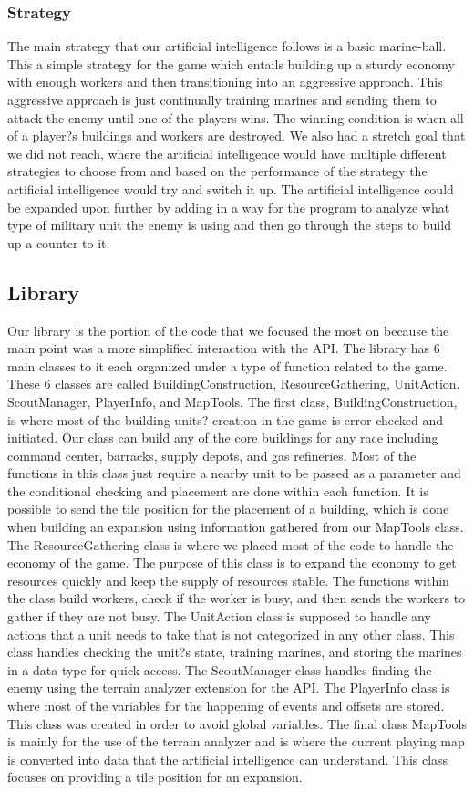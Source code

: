 \documentclass[10pt,letterpaper,onecolumn,draftclsnofoot]{IEEEtran}
\begin{document}
\subsubsection{Strategy}
The main strategy that our artificial intelligence follows is a basic marine-ball. This a simple strategy for the game which entails building up a sturdy economy with enough workers and then transitioning into an aggressive approach. This aggressive approach is just continually training marines and sending them to attack the enemy until one of the players wins. The winning condition is when all of a player?s buildings and workers are destroyed. We also had a stretch goal that we did not reach, where the artificial intelligence would have multiple different strategies to choose from and based on the performance of the strategy the artificial intelligence would try and switch it up. The artificial intelligence could be expanded upon further by adding in a way for the program to analyze what type of military unit the enemy is using and then go through the steps to build up a counter to it.
\subsection{Library}
Our library is the portion of the code that we focused the most on because the main point was a more simplified interaction with the API. The library has 6 main classes to it each organized under a type of function related to the game. These 6 classes are called BuildingConstruction, ResourceGathering, UnitAction, ScoutManager, PlayerInfo, and MapTools. The first class, BuildingConstruction, is where most of the building units? creation in the game is error checked and initiated. Our class can build any of the core buildings for any race including command center, barracks, supply depots, and gas refineries. Most of the functions in this class just require a nearby unit to be passed as a parameter and the conditional checking and placement are done within each function. It is possible to send the tile position for the placement of a building, which is done when building an expansion using information gathered from our MapTools class. The ResourceGathering class is where we placed most of the code to handle the economy of the game. The purpose of this class is to expand the economy to get resources quickly and keep the supply of resources stable. The functions within the class build workers, check if the worker is busy, and then sends the workers to gather if they are not busy. The UnitAction class is supposed to handle any actions that a unit needs to take that is not categorized in any other class. This class handles checking the unit?s state, training marines, and storing the marines in a data type for quick access. The ScoutManager class handles finding the enemy using the terrain analyzer extension for the API. The PlayerInfo class is where most of the variables for the happening of events and offsets are stored. This class was created in order to avoid global variables. The final class MapTools is mainly for the use of the terrain analyzer and is where the current playing map is converted into data that the artificial intelligence can understand. This class focuses on providing a tile position for an expansion.
\end{document}
